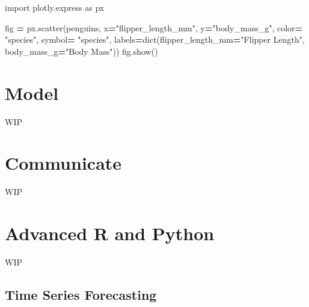 \documentclass[
]{book}
\newenvironment{Shaded}{\begin{snugshade}}{\end{snugshade}}
\newcommand{\BuiltInTok}[1]{#1}
\newcommand{\ImportTok}[1]{#1}
\newcommand{\NormalTok}[1]{#1}
\newcommand{\OperatorTok}[1]{\textcolor[rgb]{0.81,0.36,0.00}{\textbf{#1}}}
\newcommand{\StringTok}[1]{\textcolor[rgb]{0.31,0.60,0.02}{#1}}
\begin{document}
\begin{Shaded}
\begin{Highlighting}[]
\ImportTok{import}\NormalTok{ plotly.express }\ImportTok{as}\NormalTok{ px}

\NormalTok{fig }\OperatorTok{=}\NormalTok{ px.scatter(penguins,}
\NormalTok{                 x}\OperatorTok{=}\StringTok{"flipper\_length\_mm"}\NormalTok{,}
\NormalTok{                 y}\OperatorTok{=}\StringTok{"body\_mass\_g"}\NormalTok{,}
\NormalTok{                 color}\OperatorTok{=} \StringTok{"species"}\NormalTok{,}
\NormalTok{                 symbol}\OperatorTok{=} \StringTok{"species"}\NormalTok{,}
\NormalTok{                 labels}\OperatorTok{=}\BuiltInTok{dict}\NormalTok{(flipper\_length\_mm}\OperatorTok{=}\StringTok{"Flipper Length"}\NormalTok{,}
\NormalTok{                             body\_mass\_g}\OperatorTok{=}\StringTok{"Body Mass"}\NormalTok{))}
\NormalTok{fig.show()}
\end{Highlighting}
\end{Shaded}

\hypertarget{model}{%
\chapter{Model}\label{model}}

WIP

\hypertarget{communicate}{%
\chapter{Communicate}\label{communicate}}

WIP

\hypertarget{advanced-r-and-python}{%
\chapter{Advanced R and Python}\label{advanced-r-and-python}}

WIP

\hypertarget{time-series-forecasting}{%
\section{Time Series Forecasting}\label{time-series-forecasting}}
\end{document}
